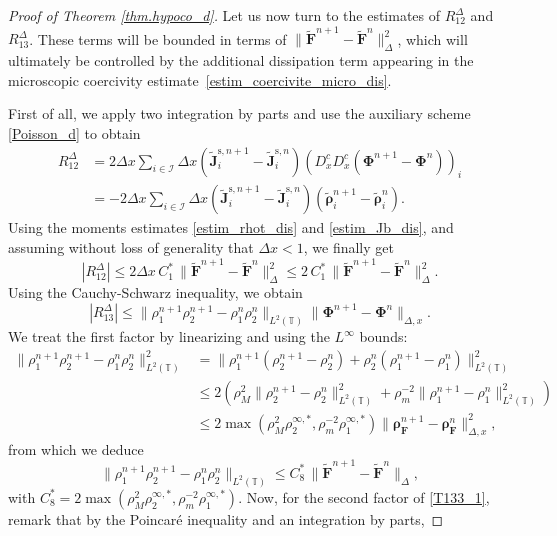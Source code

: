 \documentclass[reqno]{amsart}
\newcommand{\Dx}{\Delta x}
\newcommand{\T}{\mathbb{T}}
\newcommand{\II}{\mathcal{I}}
\newcommand{\Ft}{{\widetilde{F}}}
\newcommand{\rhot}{\widetilde{\rho}}
\newcommand{\Jt}{\widetilde{J}}
\newcommand{\Ftbf}{\mathbf{\Ft}}
\newcommand{\Fbf}{\mathbf{F}}
\newcommand{\Phibf}{\boldsymbol{\Phi}}
\newcommand{\rhobf}{\boldsymbol{\rho}}
\newcommand{\rhotbf}{\boldsymbol{\rhot}}
\newcommand{\Jtbf}{\mathbf{\Jt}}
\numberwithin{equation}{section}
\begin{document}
\begin{proof}[Proof of Theorem \ref{thm.hypoco_d}]
    Let us now turn to the estimates of $R_{12}^\Delta$ and $R_{13}^\Delta$. These terms will be bounded in terms of $\|\Ftbf^{n+1}-\Ftbf^n\|_{\Delta}^2$, which will ultimately be controlled by the additional dissipation term appearing in the microscopic coercivity estimate~\eqref{estim_coercivite_micro_dis}.
    
    First of all, we apply two integration by parts and use the auxiliary scheme \eqref{Poisson_d} to obtain
    \begin{align*}
        R_{12}^\Delta&=2\Dx \sum_{i\in\II}\Dx \left(\Jtbf_{i}^{\mathrm{s},n+1}-\Jtbf_{i}^{\mathrm{s},n}\right)\left(D_x^cD_x^c(\Phibf^{n+1}-\Phibf^n)\right)_i\\
        &=-2\Dx\sum_{i\in\II}\Dx\left(\Jtbf_{i}^{\mathrm{s},n+1}-\Jtbf_{i}^{\mathrm{s},n}\right)\left(\rhotbf_{i}^{n+1}-\rhotbf_{i}^n\right).
    \end{align*}
    Using the moments estimates \eqref{estim_rhot_dis} and \eqref{estim_Jb_dis}, and assuming without loss of generality that $\Dx<1$, we finally get
    \begin{equation}\label{estim_T132}
        |R_{12}^\Delta|\leq 2\Dx \,C_1^*\,\|\Ftbf^{n+1}-\Ftbf^n\|_\Delta^2\leq 2\,C_1^*\,\|\Ftbf^{n+1}-\Ftbf^n\|_\Delta^2.
    \end{equation}
     Using the Cauchy-Schwarz inequality, we obtain
    \begin{equation}\label{T133_1}
        |R_{13}^\Delta|\leq \|\rho_1^{n+1}\rho_2^{n+1}-\rho_1^n\rho_2^n\|_{L^2(\T)}\|\Phibf^{n+1}-\Phibf^n\|_{\Delta,x}.
    \end{equation}
     We treat the first factor by linearizing and using the $L^\infty$ bounds:
    \begin{align*}
        \|\rho_1^{n+1}\rho_2^{n+1}-\rho_1^n\rho_2^n\|_{L^2(\T)}^2 &=  \|\rho_1^{n+1}(\rho_2^{n+1}-\rho_2^n)+\rho_2^n(\rho_1^{n+1}-\rho_1^n)\|_{L^2(\T)}^2\\
        &\leq 2 \left(\rho_M^2\|\rho_2^{n+1}-\rho_2^n\|^2_{L^2(\T)}+\rho_m^{-2}\|\rho_1^{n+1}-\rho_1^n\|_{L^2(\T)}^2\right)\\
        & \leq 2 \max(\rho_M^2\rho_2^{\infty,*},\rho_m^{-2}\rho_{1}^{\infty,*})\|\rhobf_{\Fbf}^{n+1}-\rhobf_\Fbf^n\|_{\Delta,x}^2,
    \end{align*}
    from which we deduce
    \[
    \|\rho_1^{n+1}\rho_2^{n+1}-\rho_1^n\rho_2^n\|_{L^2(\T)} \leq C_{8}^*\,\|\Ftbf^{n+1}-\Ftbf^n\|_{\Delta},
    \]
    with $C_{8}^*=2 \max(\rho_M^2\rho_2^{\infty,*},\rho_m^{-2}\rho_{1}^{\infty,*})$. Now, for the second factor of \eqref{T133_1}, remark that by the Poincaré inequality and an integration by parts, 

\end{proof}
\end{document}
